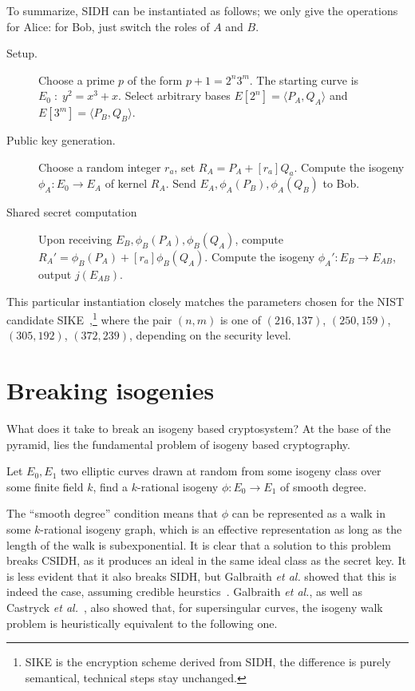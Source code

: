\begin{otherlanguage}{english}
To summarize, SIDH can be instantiated as follows; we only give the
operations for Alice: for Bob, just switch the roles of $A$ and $B$.
\begin{description}
\item[Setup.] Choose a prime $p$ of the form $p+1=2^n3^m$. The starting
  curve is $E_0\;:\;y^2=x^3+x$. Select arbitrary bases
  $E[2^n]=\langle P_A,Q_A\rangle$ and $E[3^m]=\langle P_B,Q_B\rangle$.
\item[Public key generation.] Choose a random integer $r_a$, set
  $R_A=P_A+[r_a]Q_a$. Compute the isogeny $\phi_A:E_0\to E_A$ of
  kernel $R_A$. Send $E_A,\phi_A(P_B),\phi_A(Q_B)$ to Bob.
\item[Shared secret computation] Upon receiving
  $E_B,\phi_B(P_A),\phi_B(Q_A)$, compute
  $R_A'=\phi_B(P_A)+[r_a]\phi_B(Q_A)$. Compute the isogeny
  $\phi_A':E_B\to E_{AB}$, output $j(E_{AB})$.
\end{description}

This particular instantiation closely matches the parameters chosen
for the NIST candidate SIKE~\cite{SIKE},\footnote{SIKE is the
  encryption scheme derived from SIDH, the difference is purely
  semantical, technical steps stay unchanged.} where the pair $(n,m)$
is one of $(216,137)$, $(250, 159)$, $(305, 192)$, $(372, 239)$,
depending on the security level.


\section{Breaking isogenies}
What does it take to break an isogeny based cryptosystem? At the base
of the pyramid, lies the fundamental problem of isogeny based
cryptography.

\begin{definition}
  Let $E_0,E_1$ two elliptic curves drawn at random from some isogeny
  class over some finite field $k$, find a $k$-rational isogeny
  $\phi:E_0\to E_1$ of smooth degree.
\end{definition}

The ``smooth degree'' condition means that $\phi$ can be represented
as a walk in some $k$-rational isogeny graph, which is an effective
representation as long as the length of the walk is subexponential.
It is clear that a solution to this problem breaks CSIDH, as it
produces an ideal in the same ideal class as the secret key.  It is
less evident that it also breaks SIDH, but Galbraith \emph{et al.}
showed that this is indeed the case, assuming credible
heurstics~\cite{AC:GPST16}. Galbraith \emph{et al.}, as well as
Castryck \emph{et al.}~\cite{EC:CasPanVer20}, also showed that, for
supersingular curves, the isogeny walk problem is heuristically
equivalent to the following one.


\end{otherlanguage}

